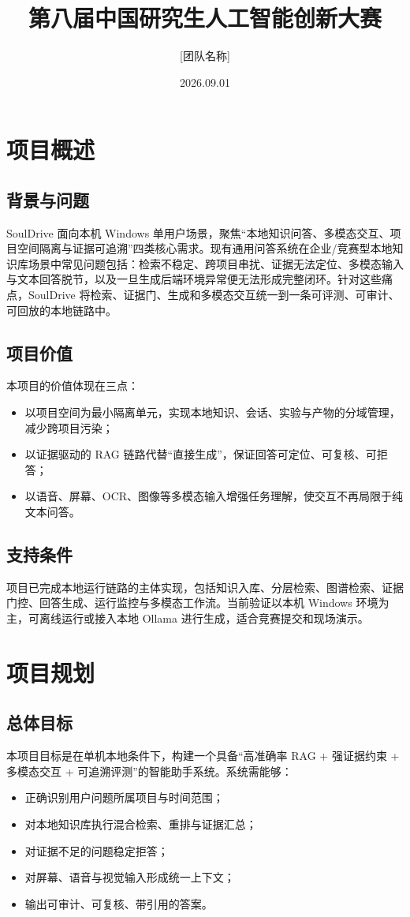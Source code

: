 \documentclass[UTF8,12pt]{ctexart}
\title{第八届中国研究生人工智能创新大赛\项目文档}\
\author{[团队名称]}
\date{2026.09.01}
\begin{document}
\maketitle

\section{项目概述}

\subsection{背景与问题}
SoulDrive 面向本机 Windows 单用户场景，聚焦“本地知识问答、多模态交互、项目空间隔离与证据可追溯”四类核心需求。现有通用问答系统在企业/竞赛型本地知识库场景中常见问题包括：检索不稳定、跨项目串扰、证据无法定位、多模态输入与文本回答脱节，以及一旦生成后端环境异常便无法形成完整闭环。针对这些痛点，SoulDrive 将检索、证据门、生成和多模态交互统一到一条可评测、可审计、可回放的本地链路中。

\subsection{项目价值}
本项目的价值体现在三点：
\begin{itemize}
  \item 以项目空间为最小隔离单元，实现本地知识、会话、实验与产物的分域管理，减少跨项目污染；
  \item 以证据驱动的 RAG 链路代替“直接生成”，保证回答可定位、可复核、可拒答；
  \item 以语音、屏幕、OCR、图像等多模态输入增强任务理解，使交互不再局限于纯文本问答。
\end{itemize}

\subsection{支持条件}
项目已完成本地运行链路的主体实现，包括知识入库、分层检索、图谱检索、证据门控、回答生成、运行监控与多模态工作流。当前验证以本机 Windows 环境为主，可离线运行或接入本地 Ollama 进行生成，适合竞赛提交和现场演示。

\section{项目规划}

\subsection{总体目标}
本项目目标是在单机本地条件下，构建一个具备“高准确率 RAG + 强证据约束 + 多模态交互 + 可追溯评测”的智能助手系统。系统需能够：
\begin{itemize}
  \item 正确识别用户问题所属项目与时间范围；
  \item 对本地知识库执行混合检索、重排与证据汇总；
  \item 对证据不足的问题稳定拒答；
  \item 对屏幕、语音与视觉输入形成统一上下文；
  \item 输出可审计、可复核、带引用的答案。
\end{itemize}
\end{document}
